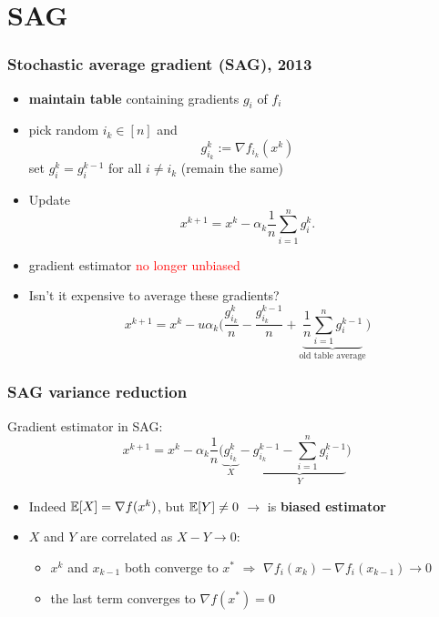 \documentclass[aspectratio=149]{beamer}
\begin{document}
\section{SAG}%
\label{sec:}

\begin{frame}
  \frametitle{Stochastic average gradient (SAG), 2013}
  \begin{itemize}
    \item \textbf{maintain table} containing gradients $g_i$ of $f_i$
    \item pick random $i_k \in [n]$ and
          \begin{equation}
            g_{i_k}^k := \nabla f_{i_k}(x^{k})
          \end{equation}
          set $g_{i}^k = g_i^{k-1}$ for all $i\neq i_k$ (remain the same)
    \item Update
          \begin{equation}
            x^{k+1} = x^k - \alpha_k \frac{1}{n} \sum_{i=1}^{n} g_i^k.
          \end{equation}
    \item gradient estimator \textcolor{red}{no longer unbiased}
    \item Isn't it expensive to average these gradients?
          \begin{equation}
            x^{k+1} = x^k -u \alpha_k  \Big( \frac{g_{i_k}^k}{n} - \frac{g_{i_k}^{k-1}}{n} + \underbrace{\frac{1}{n}\sum_{i=1}^{n} g_i^{k-1}}_{\text{old table average}} \Big)
          \end{equation}
  \end{itemize}
\end{frame}


\begin{frame}
  \frametitle{SAG variance reduction}
  Gradient estimator in SAG:
  \begin{equation}
    x^{k+1} = x^k - \alpha_k \frac{1}{n} \Big( \underbrace{g_{i_k}^k}_X - \underbrace{g_{i_k}^{k-1} - \sum_{i=1}^{n} g_i^{k-1}}_{Y} \Big)
  \end{equation}
  \begin{itemize}
    \item Indeed $\mathbb{E}[X] = \nabla f(x^k)$, but $\mathbb{E}[Y]\neq 0$ $\rightarrow $ is \textbf{biased estimator}
    \item $X$ and $Y$ are correlated as $X-Y \to 0$:
          \begin{itemize}
            \item $x^k$ and $x_{k-1}$ both converge to $x^*$ $\Rightarrow$ $ \nabla f_i(x_k) - \nabla f_i(x_{k-1}) \to 0$
            \item the last term converges to $\nabla f(x^*)= 0$
          \end{itemize}
  \end{itemize}
\end{frame}
\end{document}
